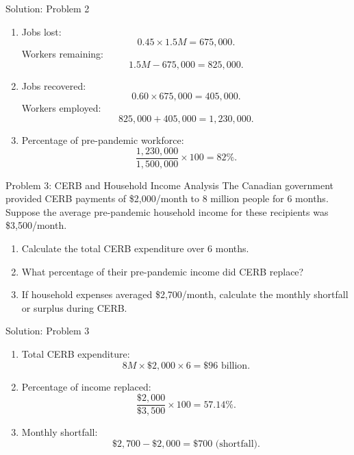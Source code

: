 \documentclass{beamer}
\begin{document}
\begin{frame}{Solution: Problem 2}
\begin{enumerate}
    \item Jobs lost: 
    \[
    0.45 \times 1.5M = 675,000.
    \]
    Workers remaining: 
    \[
    1.5M - 675,000 = 825,000.
    \]
    \item Jobs recovered: 
    \[
    0.60 \times 675,000 = 405,000.
    \]
    Workers employed: 
    \[
    825,000 + 405,000 = 1,230,000.
    \]
    \item Percentage of pre-pandemic workforce: 
    \[
    \frac{1,230,000}{1,500,000} \times 100 = 82\%.
    \]
\end{enumerate}
\end{frame}

\begin{frame}{Problem 3: CERB and Household Income Analysis}
The Canadian government provided CERB payments of \$2,000/month to 8 million people for 6 months. Suppose the average pre-pandemic household income for these recipients was \$3,500/month.

\begin{enumerate}
    \item Calculate the total CERB expenditure over 6 months.
    \item What percentage of their pre-pandemic income did CERB replace?
    \item If household expenses averaged \$2,700/month, calculate the monthly shortfall or surplus during CERB.
\end{enumerate}
\end{frame}

\begin{frame}{Solution: Problem 3}
\begin{enumerate}
    \item Total CERB expenditure: 
    \[
    8M \times \$2,000 \times 6 = \$96 \text{ billion}.
    \]
    \item Percentage of income replaced: 
    \[
    \frac{\$2,000}{\$3,500} \times 100 = 57.14\%.
    \]
    \item Monthly shortfall: 
    \[
    \$2,700 - \$2,000 = \$700 \text{ (shortfall)}.
    \]
\end{enumerate}
\end{frame}
\end{document}
